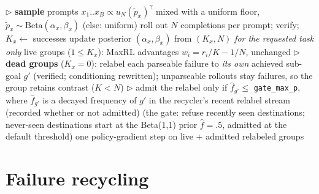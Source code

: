 \begin{algorithm}[tb]
\caption{FrontierMax: one step. Three lines differ from a standard
group-rollout loop (marked $\triangleright$).}
\label{alg:frontiermax}
\begin{algorithmic}[1]
\STATE $\triangleright$ \textbf{sample} prompts $x_1..x_B \propto
  u_N(\tilde p_x)^\gamma$ mixed with a uniform floor, $\tilde p_x \sim
  \mathrm{Beta}(\alpha_x, \beta_x)$ \hfill(else: uniform)
\STATE roll out $N$ completions per prompt; verify; $K_x \gets$
  successes
\STATE update posterior $(\alpha_x, \beta_x)$ from $(K_x, N)$
  \emph{for the requested task only}
\STATE live groups ($1 \le K_x$): MaxRL advantages
  $w_i = r_i/K - 1/N$, unchanged
\STATE $\triangleright$ \textbf{dead groups} ($K_x{=}0$): relabel each
  parseable failure to \emph{its own} achieved sub-goal $g'$
  (verified; conditioning rewritten); unparseable rollouts stay
  failures, so the group retains contrast ($K < N$)
\STATE $\triangleright$ \quad admit the relabel only if
  $\hat f_{g'} \le$ \texttt{gate\_max\_p}, where $\hat f_{g'}$ is a
  decayed frequency of $g'$ in the recycler's recent relabel stream
  (recorded whether or not admitted) \hfill(the gate: refuse
  recently seen destinations; never-seen destinations start at the
  Beta(1,1) prior $\hat f = .5$, admitted at the default threshold)
\STATE one policy-gradient step on live $+$ admitted relabeled groups
\end{algorithmic}
\end{algorithm}

\section{Failure recycling}\label{sec:recycling}

